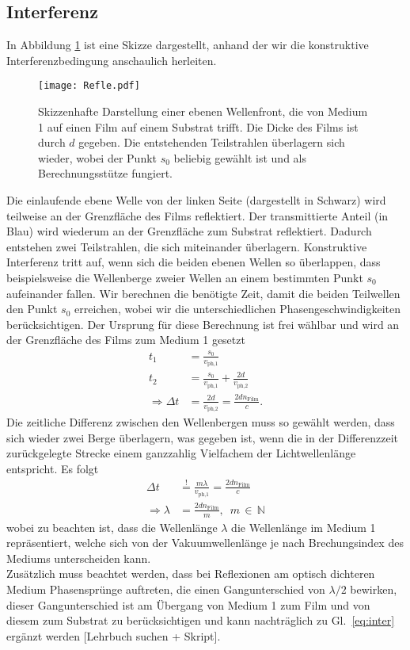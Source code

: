 \subsection{\label{subsec:FZV2}Interferenz}
In Abbildung \ref{fig:refle} ist eine Skizze dargestellt, anhand der wir die 
konstruktive Interferenzbedingung anschaulich herleiten.
\begin{figure}[h!]
    \centering
    \texttt{[image: Refle.pdf]}
    \caption{\label{fig:refle}Skizzenhafte Darstellung einer ebenen Wellenfront, 
    die von Medium 1 auf einen Film auf einem Substrat trifft. Die Dicke des Films ist 
    durch $d$ gegeben. Die entstehenden Teilstrahlen überlagern sich wieder, wobei der 
    Punkt $s_{0}$ beliebig gewählt ist und als Berechnungsstütze fungiert. }
\end{figure}\FloatBarrier
Die einlaufende ebene Welle von der linken Seite (dargestellt in Schwarz) wird teilweise 
an der Grenzfläche des Films reflektiert. 
Der transmittierte Anteil (in Blau) wird wiederum an der Grenzfläche zum Substrat reflektiert. 
Dadurch entstehen zwei Teilstrahlen, die sich miteinander überlagern. 
Konstruktive Interferenz tritt auf, wenn sich die beiden ebenen Wellen so überlappen, 
dass beispielsweise die Wellenberge zweier Wellen an einem bestimmten Punkt $s_{0}$
aufeinander fallen. Wir berechnen die benötigte Zeit, damit die beiden Teilwellen den Punkt 
$s_{0}$ erreichen, wobei wir die unterschiedlichen Phasengeschwindigkeiten berücksichtigen. \newpage
Der Ursprung für diese Berechnung ist frei wählbar und wird an der Grenzfläche des 
Films zum Medium 1 gesetzt
\begin{align}
    t_{1} &= \frac{s_{0}}{v_{\text{ph,}1}} \\
    t_{2} &= \frac{s_{0}}{v_{\text{ph,}1}} + \frac{2d}{v_{\text{ph,}2}} \\
    \Rightarrow \Delta t &= \frac{2d}{v_{\text{ph,}2}} = \frac{2dn_{\text{Film}}}{c}.
\end{align}
Die zeitliche Differenz zwischen den Wellenbergen muss so gewählt werden, dass sich
wieder zwei Berge überlagern, was gegeben ist, wenn die in der Differenzzeit zurückgelegte 
Strecke einem ganzzahlig Vielfachem der Lichtwellenlänge entspricht. 
Es folgt
\begin{align}
    \Delta t &\stackrel{!}{=} \frac{m\lambda}{v_{\text{ph,}1}} = \frac{2dn_{\text{Film}}}{c} \\
    \Rightarrow \lambda &= \frac{2dn_{\text{Film}}}{m}, \,\,\,m\,\in\,\mathbb{N}\label{eq:inter}
\end{align} 
wobei zu beachten ist, dass die Wellenlänge $\lambda$ die Wellenlänge im Medium 1 repräsentiert, 
welche sich von der Vakuumwellenlänge je nach Brechungsindex des Mediums unterscheiden kann. \\
Zusätzlich muss beachtet werden, dass bei Reflexionen am optisch dichteren Medium Phasensprünge auftreten, 
die einen Gangunterschied von $\lambda / 2$ bewirken, dieser Gangunterschied ist am Übergang von 
Medium 1 zum Film und von diesem zum Substrat zu berücksichtigen und kann 
nachträglich zu Gl.~\eqref{eq:inter} ergänzt werden [Lehrbuch suchen + Skript]. \\